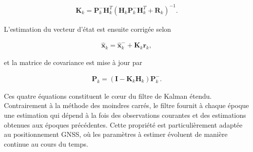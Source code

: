 \begin{align}
\mathbf{K}_k
=
\mathbf{P}_k^{-}
\mathbf{H}_k^{T}
\left(
\mathbf{H}_k
\mathbf{P}_k^{-}
\mathbf{H}_k^{T}
+
\mathbf{R}_k
\right)^{-1}.
\end{align}

L'estimation du vecteur d'état est ensuite corrigée selon

\begin{align}
\hat{\mathbf{x}}_k
=
\hat{\mathbf{x}}_k^{-}
+
\mathbf{K}_k
\mathbf{r}_k,
\end{align}

et la matrice de covariance est mise à jour par

\begin{align}
\mathbf{P}_k
=
(\mathbf{I}
-
\mathbf{K}_k
\mathbf{H}_k)
\mathbf{P}_k^{-}.
\end{align}

Ces quatre équations constituent le cœur du filtre de Kalman étendu. Contrairement à la méthode des moindres carrés, le filtre fournit à chaque époque une estimation qui dépend à la fois des observations courantes et des estimations obtenues aux époques précédentes. Cette propriété est particulièrement adaptée au positionnement GNSS, où les paramètres à estimer évoluent de manière continue au cours du temps.

